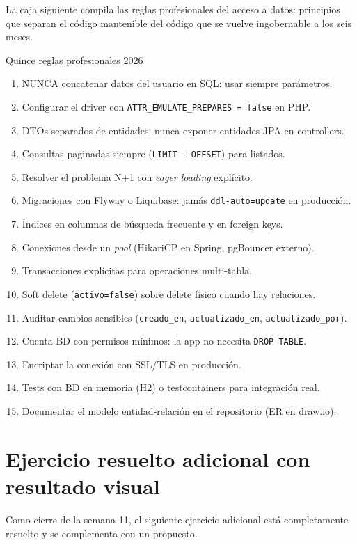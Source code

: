 La caja siguiente compila las reglas profesionales del
acceso a datos: principios que separan el código mantenible del
código que se vuelve ingobernable a los seis meses.


\begin{cajabuenas}{Quince reglas profesionales 2026}
\begin{enumerate}
\item NUNCA concatenar datos del usuario en SQL: usar siempre
parámetros.
\item Configurar el driver con \texttt{ATTR\_EMULATE\_PREPARES = false}
en PHP.
\item DTOs separados de entidades: nunca exponer entidades JPA en
controllers.
\item Consultas paginadas siempre (\texttt{LIMIT} + \texttt{OFFSET})
para listados.
\item Resolver el problema N+1 con \emph{eager loading} explícito.
\item Migraciones con Flyway o Liquibase: jamás
\texttt{ddl-auto=update} en producción.
\item Índices en columnas de búsqueda frecuente y en foreign keys.
\item Conexiones desde un \emph{pool} (HikariCP en Spring, pgBouncer
externo).
\item Transacciones explícitas para operaciones multi-tabla.
\item Soft delete (\texttt{activo=false}) sobre delete físico cuando
hay relaciones.
\item Auditar cambios sensibles (\texttt{creado\_en},
\texttt{actualizado\_en}, \texttt{actualizado\_por}).
\item Cuenta BD con permisos mínimos: la app no necesita
\texttt{DROP TABLE}.
\item Encriptar la conexión con SSL/TLS en producción.
\item Tests con BD en memoria (H2) o testcontainers para integración
real.
\item Documentar el modelo entidad-relación en el repositorio
(ER en draw.io).
\end{enumerate}
\end{cajabuenas}

\section{Ejercicio resuelto adicional con resultado visual}

Como cierre de la semana 11, el siguiente ejercicio adicional
está completamente resuelto y se complementa con un propuesto.


